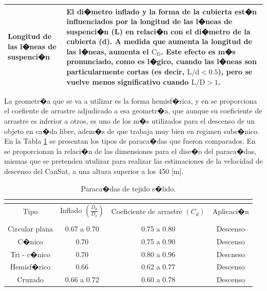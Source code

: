 \documentclass[10pt,a4paper]{book}
\begin{document}
\begin{table}[H]
\begin{center}
{\begin{tabular}{m{4cm}p{14cm}}
Longitud de las l�neas de suspenci�n & El di�metro inflado y la forma de la cubierta est�n influenciados por la longitud de las l�neas de suspenci�n (L) en relaci�n con el di�metro de la cubierta (d). A medida que aumenta la longitud de las l�neas, aumenta el $\text{C}_{\text{D}}$. Este efecto es m�s pronunciado, como es l�gico, cuando las l�neas son particularmente cortas (es decir, $\text{L} /\text{d} < 0.5$), pero se vuelve menos significativo cuando $\text{L} / \text{D} > 1$. \tabularnewline
\bottomrule
\end{tabular}
}
\end{center}
\end{table}

La geometr�a que se va a utilizar es la forma hemisf�rica, y en \cite{Parachute} se proporciona el coefiente de arrastre adjudicado a esa geometr�a, que aunque su coeficiente de arrastre es inferior a otros, es uno de los m�s utilizados para el descenso de un objeto en ca�da libre, adem�s de que trabaja muy bien en regimen subs�nico. En la Tabla \ref{PerfilesParacidas} se presentan los tipos de paraca�das que fueron comparados. En \cite{Dimensiones} se proporcionan la relaci�n de las dimensiones para el dise�o del paraca�das, mismas que se pretenden utulizar para realizar las estimaciones de la velocidad de descenso del CanSat, a una altura superior a los 450 [m].\\

\begin{table}[H]
\begin{center}
\caption{Paraca�das de tejido s�lido.}
\label{PerfilesParacidas}
\resizebox{9cm}{!} {
\begin{tabular}{m{3.5cm}m{2cm}m{4cm}m{3.5cm}}
\multicolumn{4}{c}{}\tabularnewline
\toprule
\multicolumn{1}{c}{Tipo} &\multicolumn{1}{c}{ Inflado $\left( \frac{D_{p}}{D_{o}} \right)$ }& \multicolumn{1}{c}{Coeficiente de arrastre $\left( C_{d} \right)$ }&  \multicolumn{1}{c}{ Aplicaci�n}\tabularnewline
\multicolumn{4}{c}{}\tabularnewline
\multicolumn{1}{c}{Circular plana} & \multicolumn{1}{c}{0.67 a 0.70} & \multicolumn{1}{c}{0.75 a 0.80} &\multicolumn{1}{c}{Descenso}\tabularnewline
\multicolumn{1}{c}{C�nico} & \multicolumn{1}{c}{0.70} & \multicolumn{1}{c}{0.75 a 0.90} & \multicolumn{1}{c}{Descenso}\tabularnewline
\multicolumn{1}{c}{Tri - c�nico} & \multicolumn{1}{c}{0.70} & \multicolumn{1}{c}{0.80 a 0.96} & \multicolumn{1}{c}{Descneso} \tabularnewline
\multicolumn{1}{c}{Hemisf�rico} & \multicolumn{1}{c}{0.66} & \multicolumn{1}{c}{0.62 a 0.77} & \multicolumn{1}{c}{Descenso}\tabularnewline
\multicolumn{1}{c}{Cruzado} & \multicolumn{1}{c}{0.66 a 0.72} & \multicolumn{1}{c}{0.60 a 0.78} & \multicolumn{1}{c}{Descenso}\tabularnewline  
\bottomrule
\end{tabular}
}
\end{center}
\end{table}
\end{document}
